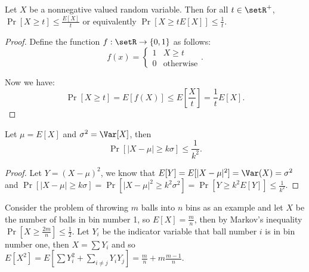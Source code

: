 \begin{theorem}
Let $X$ be a nonnegative valued random variable. Then for all $t \in \setR^+$, $\Pr[X \geq t] \leq \frac{E[X]}{t}$ or equivalently $\Pr[X \geq t E[X]] \leq \frac{1}{t}$.
\end{theorem}
\begin{proof}
Define the function $f: \setR \rightarrow \{0, 1\}$ as follows:
$$ f(x) = \left\{\begin{matrix}
1 & X \geq t \\
0 & \text{otherwise}
\end{matrix}\right..$$

Now we have:
$$\Pr[X \geq t] = E[f(X)] \leq E\left[\frac{X}{t}\right] = \frac{1}{t} E[X].$$

\end{proof}

\begin{theorem}
Let $\mu = E[X]$ and $\sigma^2 = \Var[X]$, then $$\Pr[\vert X - \mu \vert \geq k \sigma] \leq \frac{1}{k^2}.$$
\end{theorem}
\begin{proof}
Let $Y = (X - \mu)^2$, we know that $E[Y] = E[\vert X - \mu \vert ^2] = \Var(X) = \sigma^2$ and $\Pr[\vert X - \mu \vert \geq k \sigma] = \Pr[\vert X - \mu \vert^2 \geq k^2 \sigma^2] = \Pr[Y \geq k^2 E[Y]] \leq \frac{1}{k^2}.$
\end{proof}

Consider the problem of throwing $m$ balls into $n$ bins as an example and let $X$ be the number of balls in bin number 1, so $E[X] = \frac{m}{n}$, then by Markov's inequality $\Pr[X \geq \frac{2m}{n}] \leq \frac{1}{2}$. Let $Y_i$ be the indicator variable that ball number $i$ is in bin number one, then $X = \sum Y_i$ and so $E[X^2] = E[\sum Y_i^2 + \sum_{i \neq j} Y_i Y_j] = \frac{m}{n} + m \frac{m-1}{n}.$

